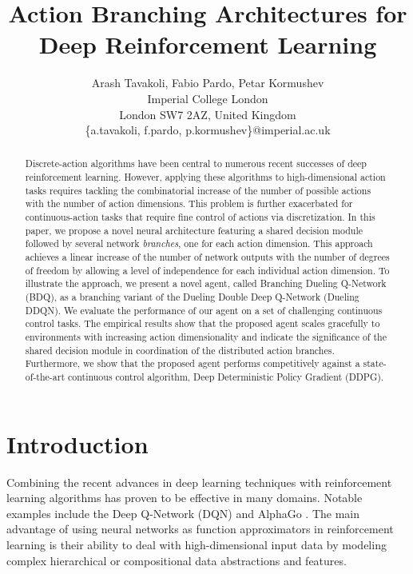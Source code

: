 \documentclass[letterpaper]{article}
\newcommand{\citep}{\cite}
\begin{document}
\title{Action Branching Architectures for Deep Reinforcement Learning}
\author{Arash Tavakoli, Fabio Pardo, Petar Kormushev\\
Imperial College London\\
London SW7 2AZ, United Kingdom\\
\{a.tavakoli, f.pardo, p.kormushev\}@imperial.ac.uk
}
\maketitle


\begin{abstract}
Discrete-action algorithms have been central to numerous recent successes of deep reinforcement learning. However, applying these algorithms to high-dimensional action tasks requires tackling the combinatorial increase of the number of possible actions with the number of action dimensions. This problem is further exacerbated for continuous-action tasks that require fine control of actions via discretization. In this paper, we propose a novel neural architecture featuring a shared decision module followed by several network \textit{branches}, one for each action dimension. This approach achieves a linear increase of the number of network outputs with the number of degrees of freedom by allowing a level of independence for each individual action dimension. To illustrate the approach, we present a novel agent, called Branching Dueling Q-Network (BDQ), as a branching variant of the Dueling Double Deep Q-Network (Dueling DDQN). We evaluate the performance of our agent on a set of challenging continuous control tasks. The empirical results show that the proposed agent scales gracefully to environments with increasing action dimensionality and indicate the significance of the shared decision module in coordination of the distributed action branches. Furthermore, we show that the proposed agent performs competitively against a state-of-the-art continuous control algorithm, Deep Deterministic Policy Gradient (DDPG).
\end{abstract}


\section{Introduction}
\label{sec:intro}

Combining the recent advances in deep learning techniques \citep{Lecun:2015deep,Schmidhuber:2015NN,Goodfellow:2016DLbook} with reinforcement learning algorithms \citep{Bertsekas:1996neuro,Sutton:1998RLbook,Szepesvari:2010algorithms} has proven to be effective in many domains. Notable examples include the Deep Q-Network (DQN) \citep{Mnih:2013,Mnih:2015natureDQN} and AlphaGo \citep{Silver:2016AlphaGo,Silver:2017AlphaGoZero}. The main advantage of using neural networks as function approximators in reinforcement learning is their ability to deal with high-dimensional input data by modeling complex hierarchical or compositional data abstractions and features.
\end{document}
